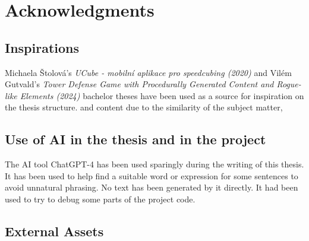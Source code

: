 \chapter{Acknowledgments}

\section{Inspirations}
Michaela Štolová's \textit{UCube - mobilní aplikace pro speedcubing (2020)}\cite{Stolova2020} and Vilém Gutvald's \textit{Tower Defense Game with Procedurally Generated Content and Rogue-like Elements (2024)}\cite{Gutvald2024} bachelor theses have been used as a source for inspiration on the thesis structure. and content due to the similarity of the subject matter,

\section{Use of AI in the thesis and in the project}
The AI tool ChatGPT-4 has been used sparingly during the writing of this thesis. It has been used to help find a suitable word or expression for some sentences to avoid unnatural phrasing. No text has been generated by it directly. It had been used to try to debug some parts of the project code.

\section{External Assets}